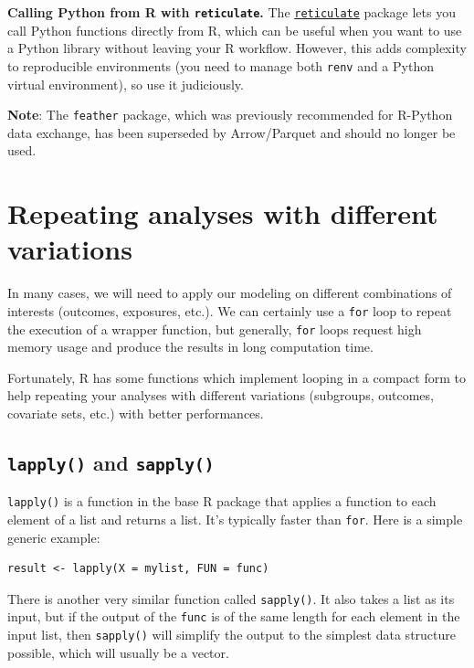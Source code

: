 \documentclass[
]{book}
\begin{document}
\textbf{Calling Python from R with \texttt{reticulate}.} The \href{https://rstudio.github.io/reticulate/}{\texttt{reticulate}} package lets you call Python functions directly from R, which can be useful when you want to use a Python library without leaving your R workflow. However, this adds complexity to reproducible environments (you need to manage both \texttt{renv} and a Python virtual environment), so use it judiciously.

\textbf{Note}: The \texttt{feather} package, which was previously recommended for R-Python data exchange, has been superseded by Arrow/Parquet and should no longer be used.

\section{Repeating analyses with different variations}\label{repeating-analyses-with-different-variations}

In many cases, we will need to apply our modeling on different combinations of interests (outcomes, exposures, etc.). We can certainly use a \texttt{for} loop to repeat the execution of a wrapper function, but generally, \texttt{for} loops request high memory usage and produce the results in long computation time.

Fortunately, R has some functions which implement looping in a compact form to help repeating your analyses with different variations (subgroups, outcomes, covariate sets, etc.) with better performances.

\subsection{\texorpdfstring{\texttt{lapply()} and \texttt{sapply()}}{lapply() and sapply()}}\label{lapply-and-sapply}

\texttt{lapply()} is a function in the base R package that applies a function to each element of a list and returns a list. It's typically faster than \texttt{for}. Here is a simple generic example:

\begin{verbatim}
result <- lapply(X = mylist, FUN = func)
\end{verbatim}

There is another very similar function called \texttt{sapply()}. It also takes a list as its input, but if the output of the \texttt{func} is of the same length for each element in the input list, then \texttt{sapply()} will simplify the output to the simplest data structure possible, which will usually be a vector.
\end{document}
